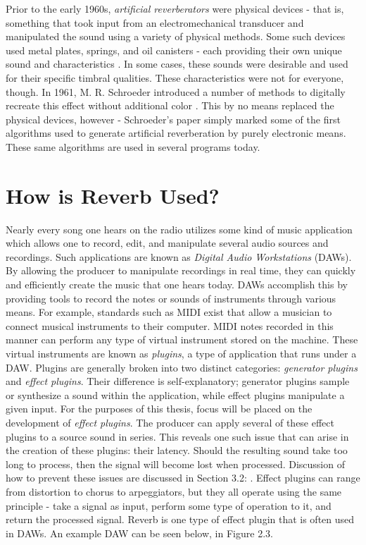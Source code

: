 Prior to the early 1960s, \textit{artificial reverberators} were physical devices - that is, something that took input from an electromechanical transducer and manipulated the sound using a variety of physical methods. Some such devices used metal plates, springs, and oil canisters - each providing their own unique sound and characteristics \cite{FiftyYears}. In some cases, these sounds were desirable and used for their specific timbral qualities. These characteristics were not for everyone, though. In 1961, M. R. Schroeder introduced a number of methods to digitally recreate this effect without additional color \cite{schroeder1961natural}. This by no means replaced the physical devices, however - Schroeder's paper simply marked some of the first algorithms used to generate artificial reverberation by purely electronic means. These same algorithms are used in several programs today.

\section{How is Reverb Used?}
Nearly every song one hears on the radio utilizes some kind of music application which allows one to record, edit, and manipulate several audio sources and recordings. Such applications are known as \textit{Digital Audio Workstations} (DAWs). By allowing the producer to manipulate recordings in real time, they can quickly and efficiently create the music that one hears today. DAWs accomplish this by providing tools to record the notes or sounds of instruments through various means. For example, standards such as MIDI exist that allow a musician to connect musical instruments to their computer. MIDI notes recorded in this manner can perform any type of virtual instrument stored on the machine. These virtual instruments are known as \textit{plugins}, a type of application that runs under a DAW. Plugins are generally broken into two distinct categories: \textit{generator plugins} and \textit{effect plugins}. Their difference is self-explanatory; generator plugins sample or synthesize a sound within the application, while effect plugins manipulate a given input. For the purposes of this thesis, focus will be placed on the development of \textit{effect plugins}. The producer can apply several of these effect plugins to a source sound in series. This reveals one such issue that can arise in the creation of these plugins: their latency. Should the resulting sound take too long to process, then the signal will become lost when processed. Discussion of how to prevent these issues are discussed in Section 3.2: . Effect plugins can range from distortion to chorus to arpeggiators, but they all operate using the same principle - take a signal as input, perform some type of operation to it, and return the processed signal. Reverb is one type of effect plugin that is often used in DAWs. An example DAW can be seen below, in Figure 2.3.

